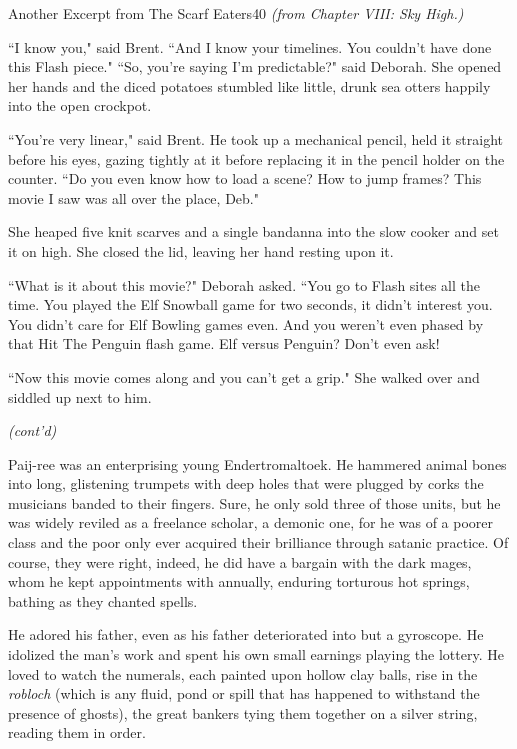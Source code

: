 \documentclass[12pt,twoside]{report}
\begin{document}
	\begin{sidebar}{Another Excerpt from The Scarf Eaters}{40}
		\textit{(from Chapter VIII: Sky High.)}\vspace{6pt}
		
``I know you," said Brent. ``And I know your timelines. You couldn't have done this Flash piece."
``So, you're saying I'm predictable?" said Deborah. She opened her hands and the diced potatoes stumbled like little, drunk sea otters happily into the open crockpot.\vspace{6pt}

``You're very linear," said Brent. He took up a mechanical pencil, held it straight before his eyes, gazing tightly at it before replacing it in the pencil holder on the counter. ``Do you even know how to load a scene? How to jump frames? This movie I saw was all over the place, Deb."\vspace{6pt}

She heaped five knit scarves and a single bandanna into the slow cooker and set it on high. She closed the lid, leaving her hand resting upon it.\vspace{6pt}

``What is it about this movie?" Deborah asked. ``You go to Flash sites all the time. You played the Elf Snowball game for two seconds, it didn't interest you. You didn't care for Elf Bowling games even. And you weren't even phased by that Hit The Penguin flash game. Elf versus Penguin? Don't even ask!\vspace{6pt}

``Now this movie comes along and you can't get a grip." She walked over and siddled up next to him.\vspace{6pt}

\textit{(cont'd)}\vspace{6pt}
	\end{sidebar}


Paij-ree was an enterprising young Endertromaltoek.
He hammered animal bones into long, glistening trumpets with deep
holes that were plugged by corks the musicians banded to their
fingers.  Sure, he only sold three of those units, but he was widely
reviled as a freelance scholar, a demonic one, for he was of a poorer
class and the poor only ever acquired their brilliance through satanic
practice.  Of course, they were right, indeed, he did have a bargain
with the dark mages, whom he kept appointments with annually, enduring
torturous hot springs, bathing as they chanted spells.

He adored his father, even as his father deteriorated into but a
gyroscope.  He idolized the man's work and spent his own small
earnings playing the lottery.  He loved to watch the numerals, each
painted upon hollow clay balls, rise in the {\em robloch} (which is
any fluid, pond or spill that has happened to withstand the presence
of ghosts), the great bankers tying them together on a silver string,
reading them in order.
\end{document}

